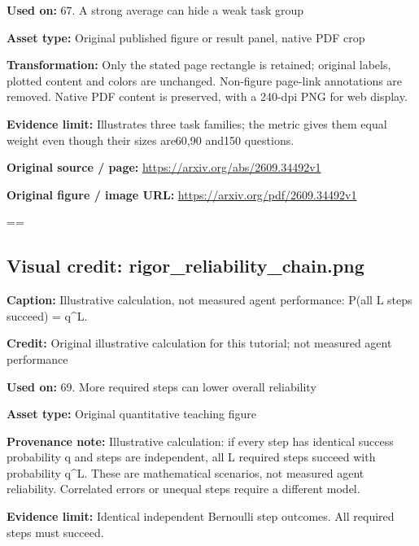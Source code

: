 \documentclass[10pt,letterpaper]{article}
\begin{document}
\textbf{Used on:} 67. A strong average can hide a weak task group\par
\textbf{Asset type:} Original published figure or result panel, native PDF crop\par
\textbf{Transformation:} Only the stated page rectangle is retained; original labels, plotted content and colors are unchanged. Non-figure page-link annotations are removed. Native PDF content is preserved, with a 240-dpi PNG for web display.\par
\textbf{Evidence limit:} Illustrates three task families; the metric gives them equal weight even though their sizes are60,90 and150 questions.\par
\textbf{Original source / page:} \href{https://arxiv.org/abs/2609.34492v1}{\small\ttfamily https:/\allowbreak{}/\allowbreak{}arxiv.\allowbreak{}org/\allowbreak{}abs/\allowbreak{}2609.\allowbreak{}34492v1}\par
\textbf{Original figure / image URL:} \href{https://arxiv.org/pdf/2609.34492v1}{\small\ttfamily https:/\allowbreak{}/\allowbreak{}arxiv.\allowbreak{}org/\allowbreak{}pdf/\allowbreak{}2609.\allowbreak{}34492v1}\par
\egroup\par\noindent\box\readingEntry\par\medskip
\setbox\readingEntry=\vbox\bgroup\hsize=\linewidth\subsection*{Visual credit: rigor\_reliability\_chain.png}
\textbf{Caption:} Illustrative calculation, not measured agent performance: P(all L steps succeed) = q\textasciicircum{}L.\par
\textbf{Credit:} Original illustrative calculation for this tutorial; not measured agent performance\par
\textbf{Used on:} 69. More required steps can lower overall reliability\par
\textbf{Asset type:} Original quantitative teaching figure\par
\textbf{Provenance note:} Illustrative calculation: if every step has identical success probability q and steps are independent, all L required steps succeed with probability q\textasciicircum{}L. These are mathematical scenarios, not measured agent reliability. Correlated errors or unequal steps require a different model.\par
\textbf{Evidence limit:} Identical independent Bernoulli step outcomes. All required steps must succeed.\par
\end{document}

